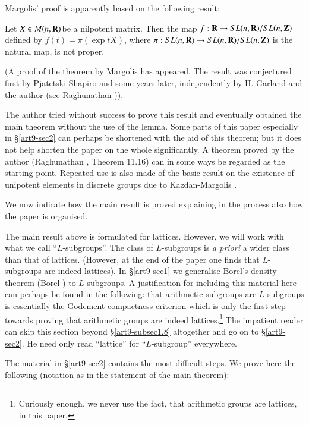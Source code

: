 Margolis' proof is apparently based on the following result:

\begin{theorem*}
Let $X \in M(n, \mathbf{R})$\pageoriginale be a nilpotent matrix. Then the map $f: \mathbf{R} \to SL (n, \mathbf{R})/ SL (n, \mathbf{Z})$ defined by $f(t) = \pi(\exp t X)$, where $\pi: SL (n, \mathbf{R}) \to S L (n, \mathbf{R})/ SL (n,\mathbf{Z})$ is the natural map, is not proper.
\end{theorem*}

(A proof of the theorem by Margolis \cite{art9-key2} has appeared. The result was conjectured first by Pjatetski-Shapiro \cite{art9-key1} and some years later, independently by H. Garland and the author (see Raghunathan \cite{art9-key4})).

The author tried without success to prove this result and eventually obtained the main theorem without the use of the lemma. Some parts of this paper especially in \S \ref{art9-sec2} can perhaps be shortened with the aid of this theorem; but it does not help shorten the paper on the whole significantly. A theorem proved by the author (Raghunathan \cite{art9-key1}, Theorem 11.16) can in some ways be regarded as the starting point. Repeated use is also made of the basic result on the existence of unipotent elements in discrete groups due to Kazdan-Margolis \cite{art9-key1}.

We now indicate how the main result is proved explaining in the process also how the paper is organised.

The main result above is formulated for lattices. However, we will work with what we call ``$L$-subgroups''. The class of $L$-subgroups is \textit{a priori} a wider class than that of lattices. (However, at the end of the paper one finds that $L$-subgroups are indeed lattices). In \S \ref{art9-sec1} we generalise Borel's density theorem (Borel \cite{art9-key1}) to $L$-subgroups. A justification for including this material here can perhaps be found in the following: that arithmetic subgroups are $L$-subgroups is essentially the Godement compactness-criterion which is only the first step towards proving that arithmetic groups are indeed lattices.\footnote{Curiously enough, we never use the fact, that arithmetic groups are lattices, in this paper.} The impatient reader can skip this section beyond \S \ref{art9-subsec1.8} altogether and go on to \S \ref{art9-sec2}. He need only read ``lattice'' for ``$L$-subgroup'' everywhere.

The material in \S \ref{art9-sec2} contains the most difficult steps.  We prove here the following (notation as in the statement of the main theorem):

